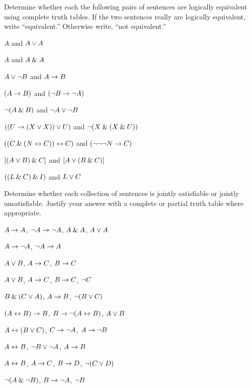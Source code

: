 \noindent\problempart
Determine whether each the following pairs of sentences are logically equivalent using complete truth tables. If the two sentences really are logically equivalent, write ``equivalent.'' Otherwise write, ``not equivalent.''
\begin{earg}
\item $A$ and $A \vee A$
\item $A$ and $A \mathbin{\&} A$
\item $A \vee \neg B$ and $A\rightarrow B$
\item $(A \rightarrow B)$ and $(\neg B \rightarrow \neg A)$
\item $\neg(A \mathbin{\&} B)$ and $\neg A \vee \neg B$
\item $ ((U \rightarrow (X \vee X)) \vee U)$ and $\neg (X \mathbin{\&} (X \mathbin{\&} U))$
\item $ ((C \mathbin{\&} (N \leftrightarrow C)) \leftrightarrow C)$ and $(\neg \neg \neg N \rightarrow C)$
\item $[(A \vee B) \mathbin{\&} C]$ and $[A \vee (B \mathbin{\&} C)]$
\item $((L \mathbin{\&} C) \mathbin{\&} I)$ and $L \vee C$
\end{earg}


\noindent\problempart
\label{pr.TT.satisfiable5}
Determine whether each collection of sentences is jointly satisfiable or jointly unsatisfiable. Justify your answer with a complete or partial truth table where appropriate.
\begin{earg}
\item $A\rightarrow A$, $\neg A \rightarrow \neg A$, $A\mathbin{\&} A$, $A\vee A$ \vspace{.5ex} \hfill {}
\item $A \rightarrow \neg A$, $\neg A \rightarrow A$\vspace{.5ex} \hfill {}
\item $A\vee B$, $A\rightarrow C$, $B\rightarrow C$\vspace{.5ex} \hfill {}
\item $A \vee B$, $A \rightarrow C$, $B \rightarrow C$, $\neg C$\vspace{.5ex} \hfill {}
\item $B\mathbin{\&}(C\vee A)$, $A\rightarrow B$, $\neg(B\vee C)$\vspace{.5ex}  \hfill {}
\item $(A \leftrightarrow B) \rightarrow B$,  $B \rightarrow \neg (A \leftrightarrow B)$, $A \vee B$ \vspace{.5ex} \hfill {}
\item $A\leftrightarrow(B\vee C)$, $C\rightarrow \neg A$, $A\rightarrow \neg B$\vspace{.5ex} \hfill {}
\item  $A \leftrightarrow B$,  $\neg B \vee \neg A$,  $A \rightarrow  B$ \vspace{.5ex} \hfill {}
\item $A \leftrightarrow B$, $A \rightarrow C$, $B \rightarrow D$, $\neg(C \vee D)$\vspace{.5ex} \hfill {}
\item $\neg (A \mathbin{\&} \neg B)$,  $B \rightarrow \neg A$, $\neg B$  \vspace{.5ex} \hfill {}
\end{earg}

